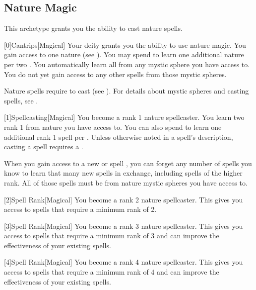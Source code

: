     \newpage
    \subsection{Nature Magic}
        This archetype grants you the ability to cast nature spells.

        [0]{Cantrips}[Magical]
        Your deity grants you the ability to use nature magic.
        You gain access to one nature  (see ).
        You may spend  to learn one additional nature  per two .
        You automatically learn all  from any mystic sphere you have access to.
        You do not yet gain access to any other spells from those mystic spheres.

        Nature spells require  to cast (see ).
        For details about mystic spheres and casting spells, see .

        [1]{Spellcasting}[Magical]
        You become a rank 1 nature spellcaster.
        You learn two rank 1  from nature  you have access to.
        You can also spend  to learn one additional rank 1 spell per .
        Unless otherwise noted in a spell's description, casting a spell requires a .

        When you gain access to a new  or spell ,
            you can forget any number of spells you know to learn that many new spells in exchange,
            including spells of the higher rank.
        All of those spells must be from nature mystic spheres you have access to.

        [2]{Spell Rank}[Magical] You become a rank 2 nature spellcaster.
        This gives you access to spells that require a minimum rank of 2.

        [3]{Spell Rank}[Magical] You become a rank 3 nature spellcaster.
        This gives you access to spells that require a minimum rank of 3 and can improve the effectiveness of your existing spells.

        [4]{Spell Rank}[Magical] You become a rank 4 nature spellcaster.
        This gives you access to spells that require a minimum rank of 4 and can improve the effectiveness of your existing spells.

